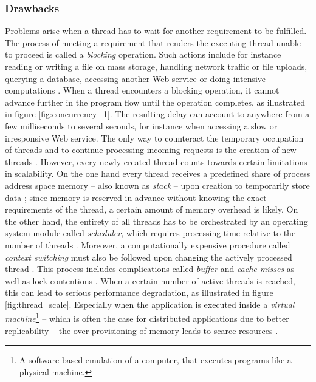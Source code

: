 \subsubsection*{Drawbacks}
Problems arise when a thread has to wait for another requirement to be fulfilled. The process of meeting a requirement that renders the executing thread unable to proceed is called a \textit{blocking} operation. Such actions include for instance reading or writing a file on mass storage, handling network traffic or file uploads, querying a database, accessing another Web service or doing intensive computations \cite[p. 196]{Henderson2006}. When a thread encounters a blocking operation, it cannot advance further in the program flow until the operation completes, as illustrated in figure \ref{fig:concurrency_1}. The resulting delay can account to anywhere from a few milliseconds to several seconds, for instance when accessing a slow or irresponsive Web service. The only way to counteract the temporary occupation of threads and to continue processing incoming requests is the creation of new threads \cite[p. 36]{Hughes-Croucher2012}. However, every newly created thread counts towards certain limitations in scalability. On the one hand every thread receives a predefined share of process address space memory -- also known as \textit{stack} -- upon creation to temporarily store data \cite{Russinovich}; since memory is reserved in advance without knowing the exact requirements of the thread, a certain amount of memory overhead is likely. On the other hand, the entirety of all threads has to be orchestrated by an operating system module called \textit{scheduler}, which requires processing time relative to the number of threads \cite{Russinovich}. Moreover, a computationally expensive procedure called \textit{context switching} must also be followed upon changing the actively processed thread \cite{threads_vs_events}. This process includes complications called \textit{buffer} and \textit{cache misses} as well as lock contentions \cite[p. 2]{Welsh2001}. When a certain number of active threads is reached, this can lead to serious performance degradation, as illustrated in figure \ref{fig:thread_scale}. Especially when the application is executed inside a \textit{virtual machine}\footnote{A software-based emulation of a computer, that executes programs like a physical machine.} -- which is often the case for distributed applications due to better replicability -- the over-provisioning of memory leads to scarce resources \cite[p. 1]{Haller2006}.

